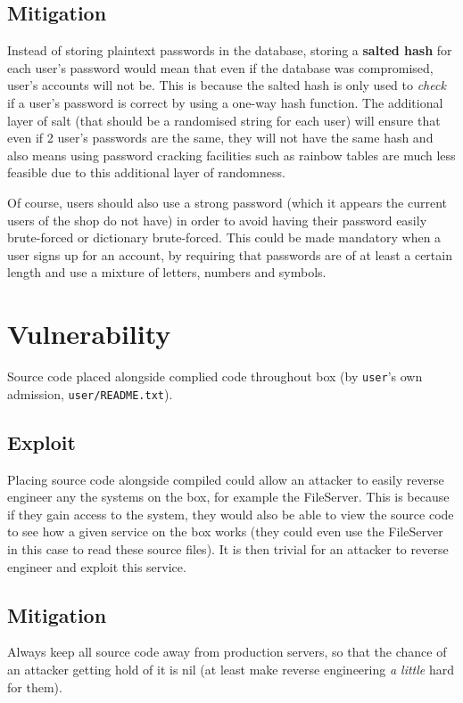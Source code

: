 \documentclass[11pt]{article}
\begin{document}
\subsection{Mitigation}

Instead of storing plaintext passwords in the database, storing a \textbf{salted hash} for each user's password would mean that even if the database was compromised, user's accounts will not be. This is because the salted hash is only used to \textit{check} if a user's password is correct by using a one-way hash function. The additional layer of salt (that should be a randomised string for each user) will ensure that even if 2 user's passwords are the same, they will not have the same hash and also means using password cracking facilities such as rainbow tables are much less feasible due to this additional layer of randomness.

Of course, users should also use a strong password (which it appears the current users of the shop do not have) in order to avoid having their password easily brute-forced or dictionary brute-forced. This could be made mandatory when a user signs up for an account, by requiring that passwords are of at least a certain length and use a mixture of letters, numbers and symbols.

\section{Vulnerability}

Source code placed alongside complied code throughout box (by \texttt{user}'s own admission, \texttt{user/README.txt}).

\subsection{Exploit}

Placing source code alongside compiled could allow an attacker to easily reverse engineer any the systems on the box, for example the FileServer. This is because if they gain access to the system, they would also be able to view the source code to see how a given service on the box works (they could even use the FileServer in this case to read these source files). It is then trivial for an attacker to reverse engineer and exploit this service.

\subsection{Mitigation}

Always keep all source code away from production servers, so that the chance of an attacker getting hold of it is nil (at least make reverse engineering \textit{a little} hard for them).
\end{document}
